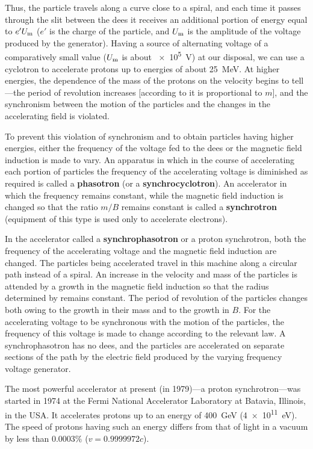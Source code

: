 Thus, the particle travels along a curve close to a spiral, and each time it passes through the slit between the dees it receives an additional portion of energy equal to $e'U_{\text{m}}$ ($e'$ is the charge of the particle, and $U_{\text{m}}$ is the amplitude of the voltage produced by the generator).
Having a source of alternating voltage of a comparatively small value ($U_{\text{m}}$ is about \SI{e5}{\volt}) at our disposal, we can use a cyclotron to accelerate protons up to energies of about \SI{25}{\mega\electronvolt}.
At higher energies, the dependence of the mass of the protons on the velocity begins to tell---the period of revolution increases [according to  it is proportional to $m$], and the synchronism between the motion of the particles and the changes in the accelerating field is violated.

To prevent this violation of synchronism and to obtain particles having higher energies, either the frequency of the voltage fed to the dees or the magnetic field induction is made to vary.
An apparatus in which in the course of accelerating each portion of particles the frequency of the accelerating voltage is diminished as required is called a \textbf{phasotron} (or a \textbf{synchrocyclotron}).
An accelerator in which the frequency remains constant, while the magnetic field induction is changed so that the ratio $m/B$ remains constant is called a \textbf{synchrotron} (equipment of this type is used only to accelerate electrons).

In the accelerator called a \textbf{synchrophasotron} or a proton synchrotron, both the frequency of the accelerating voltage and the magnetic field induction are changed.
The particles being accelerated travel in this machine along a circular path instead of a spiral.
An increase in the velocity and mass of the particles is attended by a growth in the magnetic field induction so that the radius determined by  remains constant.
The period of revolution of the particles changes both owing to the growth in their mass and to the growth in $B$.
For the accelerating voltage to be synchronous with the motion of the particles, the frequency of this voltage is made to change according to the relevant law.
A synchrophasotron has no dees, and the particles are accelerated on separate sections of the path by the electric field produced by the varying frequency voltage generator.

The most powerful accelerator at present (in 1979)---a proton synchrotron---was started in 1974 at the Fermi National Accelerator Laboratory at Batavia, Illinois, in the USA.
It accelerates protons up to an energy of \SI{400}{\giga\electronvolt} (\SI{4e11}{\electronvolt}).
The speed of protons having such an energy differs from that of light in a vacuum by less than $0.0003\%$ ($v = 0.9999972c$).
